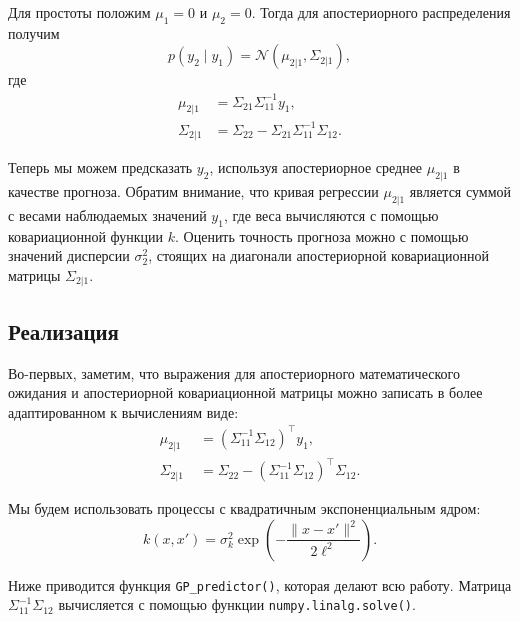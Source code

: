\documentclass[11pt,a4paper]{article}
\begin{document}
    Для простоты положим \(\mu_{1} = 0\) и \(\mu_{2} = 0\). Тогда для
апостериорного распределения получим \[
  p(y_2 \mid y_1) = \mathcal{N}(\mu_{2|1}, \Sigma_{2|1}),
\] где \[
\begin{split}
    \mu_{2|1}    &= \Sigma_{21} \Sigma_{11}^{-1} y_1, \\
    \Sigma_{2|1} &= \Sigma_{22} - \Sigma_{21} \Sigma_{11}^{-1}\Sigma_{12}.
\end{split}
\]

Теперь мы можем предсказать \(y_2\), используя апостериорное среднее
\(\mu_{2|1}\) в качестве прогноза. Обратим внимание, что кривая
регрессии \(\mu_{2|1}\) является суммой с весами наблюдаемых значений
\(y_1\), где веса вычисляются с помощью ковариационной функции \(k\).
Оценить точность прогноза можно с помощью значений дисперсии
\(\sigma_2^2\), стоящих на диагонали апостериорной ковариационной
матрицы \(\Sigma_{2|1}\).

    \hypertarget{ux440ux435ux430ux43bux438ux437ux430ux446ux438ux44f}{%
\subsection{Реализация}\label{ux440ux435ux430ux43bux438ux437ux430ux446ux438ux44f}}

Во-первых, заметим, что выражения для апостериорного математического
ожидания и апостериорной ковариационной матрицы можно записать в более
адаптированном к вычислениям виде: \[
\begin{split}
    \mu_{2|1}    &\;= (\Sigma_{11}^{-1}\Sigma_{12})^\top  y_1, \\
    \Sigma_{2|1} &\;= \Sigma_{22} - (\Sigma_{11}^{-1}\Sigma_{12})^\top  \Sigma_{12}.
\end{split}
\]

    Мы будем использовать процессы с квадратичным экспоненциальным ядром: \[
  k(x, x') = \sigma_k^2 \exp{ \left( -\frac{\lVert x - x' \rVert^2}{2\ell^2}  \right) }.
\]

Ниже приводится функция \texttt{GP\_predictor()}, которая делают всю
работу. Матрица \(\Sigma_{11}^{-1}\Sigma_{12}\) вычисляется с помощью
функции \texttt{numpy.linalg.solve()}.
\end{document}
